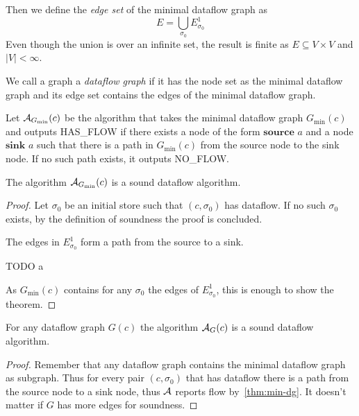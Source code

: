 Then we define the \emph{edge set} of the minimal dataflow graph as
\begin{equation*}
    E = \bigcup_{\sigma_0} E^1_{\sigma_0}
\end{equation*}
Even though the union is over an infinite set, the result is finite
as $E \subseteq V \times V$ and $|V| < \infty$.

We call a graph a \emph{dataflow graph} if it has the node set as the minimal
dataflow graph and its edge set contains the edges of the minimal dataflow 
graph.

Let $\operatorname{\mathcal{A}}_{G_\text{min}}(c)$ be the algorithm that takes the
minimal dataflow graph $G_\text{min}(c)$ and outputs HAS\_FLOW if there 
exists a node of the form 
$\textbf{source }a$ and a node $\textbf{sink }a$ such that there is a path in 
$G_\text{min}(c)$ from the source node to the sink node.
If no such path exists, it outputs NO\_FLOW.



\begin{theorem}
    \label{thm:min-dg}
    The algorithm $\operatorname{\mathcal{A}}_{G_\text{min}}(c)$ is a sound dataflow algorithm.
\end{theorem}
\begin{proof}
    Let $\sigma_0$ be an initial store such that $(c, \sigma_0)$ has dataflow.
    If no such $\sigma_0$ exists, by the definition of soundness
    the proof is concluded.

    \begin{claim}
        The edges in $E^1_{\sigma_0}$ form a path from the source to a sink.
    \end{claim}
    \begin{claimproof}
        TODO a
    \end{claimproof}
    As $G_\text{min}(c)$ contains for any $\sigma_0$ the edges of $E^1_{\sigma_0}$,
    this is enough to show the theorem.
\end{proof}

\begin{corollary}
    \label{cor:dg-sound}
    For any dataflow graph $G(c)$ the algorithm $\operatorname{\mathcal{A}}_{G}(c)$ is a sound
     dataflow algorithm.
\end{corollary}
\begin{proof}
    Remember that any dataflow graph contains the minimal dataflow graph as 
    subgraph. Thus for every pair $(c, \sigma_0)$ that has dataflow
    there is a path from the source node to a sink node, 
    thus $\operatorname{\mathcal{A}}$ reports flow by~\autoref{thm:min-dg}.
    It doesn't matter if $G$ has more edges for soundness.
\end{proof}

